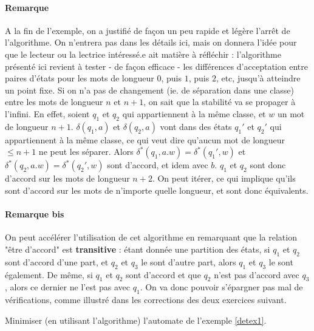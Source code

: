 \paragraph*{Remarque} A la fin de l'exemple, on a justifié de façon un peu rapide et légère l'arrêt de l'algorithme. On n'entrera pas dans les détails ici, mais on donnera l'idée pour que le lecteur ou la lectrice intéressé.e ait matière à réfléchir : l'algorithme présenté ici revient à tester - de façon efficace - les différences d'acceptation entre paires d'états pour les mots de longueur $0$, puis $1$, puis $2$, etc, jusqu'à atteindre un point fixe. Si on n'a pas de changement (ie. de séparation dans une classe) entre les mots de longueur $n$ et $n+1$, on sait que la stabilité va se propager à l'infini. En effet, soient $q_1$ et $q_2$ qui appartiennent à la même classe, et $w$ un mot de longueur $n+1$. $\delta(q_1,a)$ et $\delta(q_2,a)$ vont dans des états $q_1'$ et $q_2'$ qui appartiennent à la même classe, ce qui veut dire qu'aucun mot de longueur $\leq n+1$ ne peut les séparer. Alors $\delta^*(q_1,a.w) = \delta^*(q_1',w)$ et $\delta^*(q_2,a.w) = \delta^*(q_2',w)$ sont d'accord, et idem avec $b$. $q_1$ et $q_2$ sont donc d'accord sur les mots de longueur $n+2$. On peut itérer, ce qui implique qu'ils sont d'accord sur les mots de n'importe quelle longueur, et sont donc équivalents. 

\paragraph*{Remarque bis} On peut accélérer l'utilisation de cet algorithme en remarquant que la relation "être d'accord" est \textbf{transitive} : étant donnée une partition des états, si $q_1$ et $q_2$ sont d'accord d'une part, et $q_2$ et $q_3$ le sont d'autre part, alors $q_1$ et $q_3$ le sont également. De même, si $q_1$ et $q_2$ sont d'accord et que $q_2$ n'est pas d'accord avec $q_3$, alors ce dernier ne l'est pas avec $q_1$. On va donc pouvoir s'épargner pas mal de vérifications, comme illustré dans les corrections des deux exercices suivant.

\begin{exercice}
Minimiser (en utilisant l'algorithme) l'automate de l'exemple \ref{detex1}.
\end{exercice}


